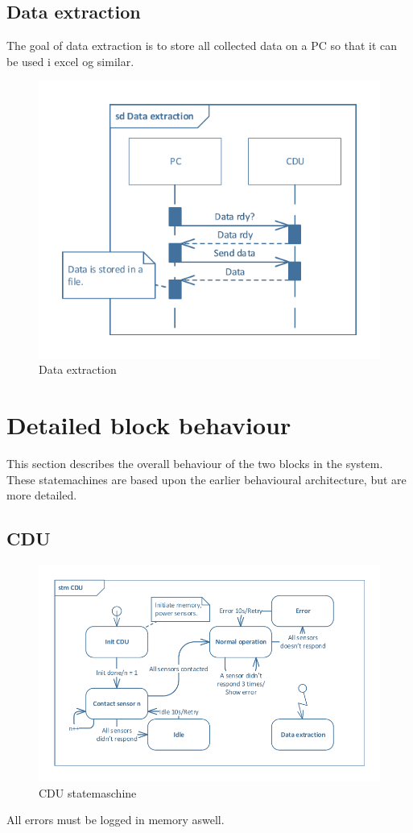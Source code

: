 \subsection{Data extraction}
The goal of data extraction is to store all collected data on a PC so that it can be used i excel og similar.

\begin{figure}[hbpt]
\centering
\includegraphics[width=.6\textwidth]{billeder/data_extraction_sd}
\caption{Data extraction}
\end{figure}

\newpage

\section{Detailed block behaviour}
This section describes the overall behaviour of the two blocks in the system.\\
These statemachines are based upon the earlier behavioural architecture, but are more detailed.

\subsection{CDU}

\begin{figure}[hbpt]
\centering
\includegraphics[width=.8\textwidth]{billeder/CDU_STM}
\caption{CDU statemaschine}
\end{figure}
All errors must be logged in memory aswell.

